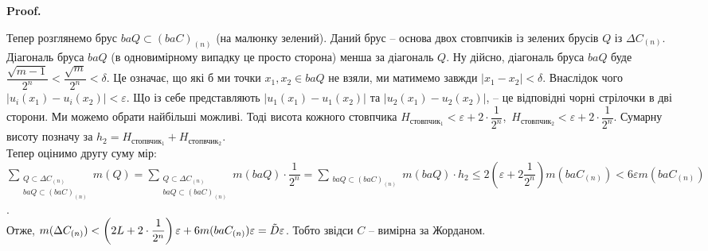 \documentclass[a4paper, 10pt]{article}
\makeatletter
\def\qed{$\blacksquare$}
\theoremstyle{theoremdd}
\theoremstyle{theoremdd}
\theoremstyle{theoremdd}
\theoremstyle{theoremdd}
\theoremstyle{theoremdd}
\theoremstyle{theoremdd}
\theoremstyle{theoremdd}
\theoremstyle{theoremdd}
\theoremstyle{theoremdd}
\theoremstyle{theoremdd}
\theoremstyle{theoremdd}
\theoremstyle{theoremdd}
\theoremstyle{theoremdd}
\theoremstyle{theoremdd}
\theoremstyle{theoremdd}
\renewenvironment{proof}[1][Proof.\\]{\par
\pushQED{\hfill \qed}%
\normalfont \topsep6\p@\@plus6\p@\relax
\trivlist
\item\relax
{\bfseries
#1\@addpunct{.}}\hspace\labelsep\ignorespaces
}{%
\popQED\endtrivlist\@endpefalse
}
\makeatother
\begin{document}
\begin{proof}
\begin{figure}[H]
\end{figure}
Тепер розглянемо брус $baQ \subset (baC)_{(n)}$ (на малюнку зелений). Даний брус -- основа двох стовпчиків із зелених брусів $Q$ із $\Delta C_{(n)}$. Діагональ бруса $baQ$ (в одновимірному випадку це просто сторона) менша за діагональ $Q$. Ну дійсно, діагональ бруса $baQ$ буде $\dfrac{\sqrt{m-1}}{2^n} < \dfrac{\sqrt{m}}{2^n} < \delta$. Це означає, що які б ми точки $x_1,x_2 \in baQ$ не взяли, ми матимемо завжди $|x_1-x_2| < \delta$. Внаслідок чого $|u_i(x_1) - u_i(x_2)| < \varepsilon$. Що із себе представляють $|u_1(x_1) - u_1(x_2)|$ та $|u_2(x_1) - u_2(x_2)|$, -- це відповідні чорні стрілочки в дві сторони. Ми можемо обрати найбільші можливі. Тоді висота кожного стовпчика $H_{\text{стовпчик}_1} < \varepsilon + 2 \cdot \dfrac{1}{2^n}$,\ $H_{\text{стовпчик}_2} < \varepsilon + 2 \cdot \dfrac{1}{2^n}$. Сумарну висоту позначу за $h_2 = H_{\text{стопвчик}_1} + H_{\text{стопвчик}_2}$.\\
Тепер оцінимо другу суму мір:\\
$\displaystyle\sum_{\substack{Q \subset \Delta C_{(n)} \\ baQ \subset (baC)_{(n)} }} m(Q) = \sum_{\substack{Q \subset \Delta C_{(n)} \\ baQ \subset (baC)_{(n)}}} m(baQ) \cdot \dfrac{1}{2^n} = \sum_{\substack{baQ \subset (baC)_{(n)}}} m(baQ) \cdot h_2 \leq 2 \left(  \varepsilon + 2 \dfrac{1}{2^n} \right) m(baC_{(n)}) < 6 \varepsilon m(baC_{(n)})$.\\
Отже, $m(\Delta C_{(n)}) \\ < \left( 2L + 2 \cdot \dfrac{1}{2^n} \right) \varepsilon + 6 m(baC_{(n)}) \varepsilon = \tilde{D} \varepsilon$. Тобто звідси $C$ -- вимірна за Жорданом.
\end{proof}
\end{document}
